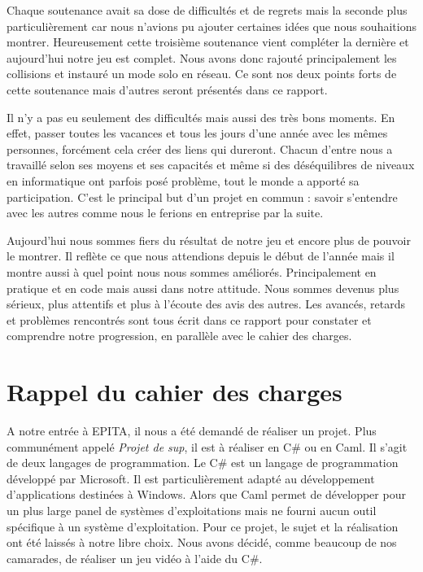 \documentclass[12pt]{article}
\begin{document}
Chaque soutenance avait sa dose de difficultés et de regrets mais la seconde plus particulièrement car nous n’avions pu ajouter certaines idées que nous souhaitions montrer. Heureusement cette troisième soutenance vient compléter la dernière et aujourd’hui notre jeu est complet. Nous avons donc rajouté principalement les collisions et instauré un mode solo en réseau. Ce sont nos deux points forts de cette soutenance mais d’autres seront présentés dans ce rapport.

Il n’y a pas eu seulement des difficultés mais aussi des très bons moments. En effet, passer toutes les vacances et tous les jours  d’une année avec les mêmes personnes, forcément cela créer des liens qui dureront. Chacun d’entre nous a travaillé selon ses moyens et ses capacités et même si des déséquilibres de niveaux en informatique ont parfois posé problème, tout le monde a apporté sa participation. C’est le principal but d’un projet en commun : savoir s’entendre avec les autres comme nous le ferions en entreprise par la suite.

Aujourd’hui nous sommes fiers du résultat  de notre jeu et encore plus de pouvoir le montrer. Il reflète ce que nous attendions depuis le début de l’année mais il montre aussi à quel point nous nous sommes améliorés. Principalement en pratique et en code mais aussi dans notre attitude. Nous sommes devenus plus sérieux, plus attentifs et plus à l'écoute des avis des autres. Les avancés, retards et problèmes rencontrés sont tous écrit dans ce rapport pour constater et comprendre notre progression, en parallèle avec le cahier des charges.


\newpage

\section{Rappel du cahier des charges}

A notre entrée à EPITA, il nous a été demandé de réaliser un projet. Plus communément appelé \textit{Projet de sup}, il est à réaliser en C\# ou en Caml. Il s'agit de deux langages de programmation. Le C\# est un langage de programmation développé par Microsoft. Il est particulièrement adapté au développement d'applications destinées à Windows. Alors que Caml permet de développer pour un plus large panel de systèmes d'exploitations mais ne fourni aucun outil spécifique à un système d'exploitation. Pour ce projet, le sujet et la réalisation ont été laissés à notre libre choix. Nous avons décidé, comme beaucoup de nos camarades, de réaliser un jeu vidéo à l'aide du C\#.
\end{document}

